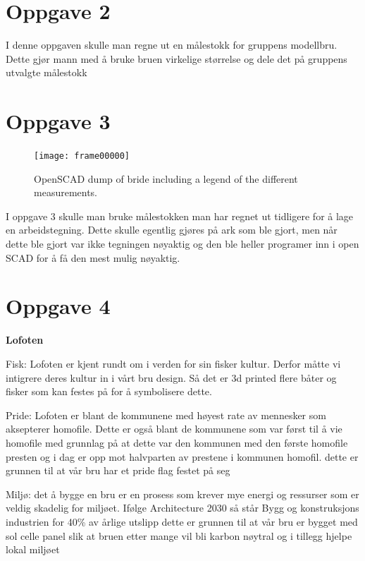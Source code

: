 \documentclass{report}
\begin{document}
\section*{Oppgave 2}

I denne oppgaven skulle man regne ut en målestokk for gruppens modellbru. Dette gjør mann med å bruke bruen virkelige størrelse og dele det på gruppens utvalgte målestokk

\section*{Oppgave 3}


\begin{figure}[t]
	\centering
	\texttt{[image: frame00000]}

	\caption {OpenSCAD dump of bride including a legend of the different measurements.}
	\label{fig:bridge}
\end{figure}

I oppgave 3 skulle man bruke målestokken man har regnet ut tidligere for å lage en arbeidstegning. Dette skulle egentlig gjøres på ark som ble gjort, men når dette ble gjort var ikke tegningen nøyaktig og den ble heller programer inn i open SCAD for å få den mest mulig nøyaktig.

\section*{Oppgave 4}

\textbf {Lofoten}

Fisk: Lofoten er kjent rundt om i verden for sin fisker kultur. Derfor måtte vi intigrere deres kultur in i vårt bru design. Så det er 3d printed flere båter og fisker som kan festes på for å symbolisere dette.

Pride: Lofoten er blant de kommunene med høyest rate av mennesker som aksepterer homofile. Dette er også blant de kommunene som var først til å vie homofile med grunnlag på at dette var den kommunen med den første homofile presten og i dag er opp mot halvparten av prestene i kommunen homofil. dette er grunnen til at vår bru har et pride flag festet på seg

Miljø: det å bygge en bru er en prosess som krever mye energi og ressurser som er veldig skadelig for miljøet. Ifølge Architecture 2030 så står Bygg og konstruksjons industrien for 40\% av årlige utslipp dette er grunnen til at vår bru er bygget med sol celle panel slik at bruen etter mange vil bli karbon nøytral og i tillegg hjelpe lokal miljøet
\end{document}
